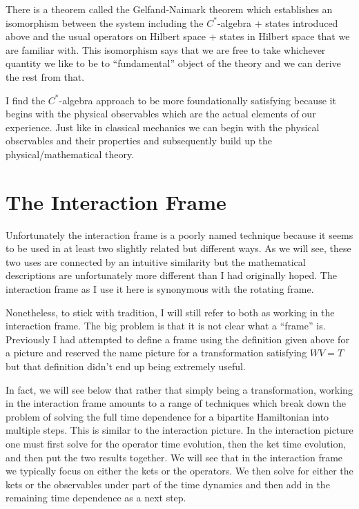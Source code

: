 \documentclass[12pt]{article}
\begin{document}
There is a theorem called the Gelfand-Naimark theorem which establishes an isomorphism between the system including the $C^*$-algebra + states introduced above and the usual operators on Hilbert space + states in Hilbert space that we are familiar with. This isomorphism says that we are free to take whichever quantity we like to be to ``fundamental'' object of the theory and we can derive the rest from that.

I find the $C^*$-algebra approach to be more foundationally satisfying because it begins with the physical observables which are the actual elements of our experience. Just like in classical mechanics we can begin with the physical observables and their properties and subsequently  build up the physical/mathematical theory.

\section{The Interaction Frame}

Unfortunately the interaction frame is a poorly named technique because it seems to be used in at least two slightly related but different ways. As we will see, these two uses are connected by an intuitive similarity but the mathematical descriptions are unfortunately more different than I had originally hoped. The interaction frame as I use it here is synonymous with the rotating frame.

Nonetheless, to stick with tradition, I will still refer to both as working in the interaction frame. The big problem is that it is not clear what a ``frame'' is. Previously I had attempted to define a frame using the definition given above for a picture and reserved the name picture for a transformation satisfying $WV = T$ but that definition didn't end up being extremely useful. 

In fact, we will see below that rather that simply being a transformation, working in the interaction frame amounts to a range of techniques which break down the problem of solving the full time dependence for a bipartite Hamiltonian into multiple steps. This is similar to the interaction picture. In the interaction picture one must first solve for the operator time evolution, then the ket time evolution, and then put the two results together. We will see that in the interaction frame we typically focus on either the kets or the operators. We then solve for either the kets or the observables under part of the time dynamics and then add in the remaining time dependence as a next step.
\end{document}
